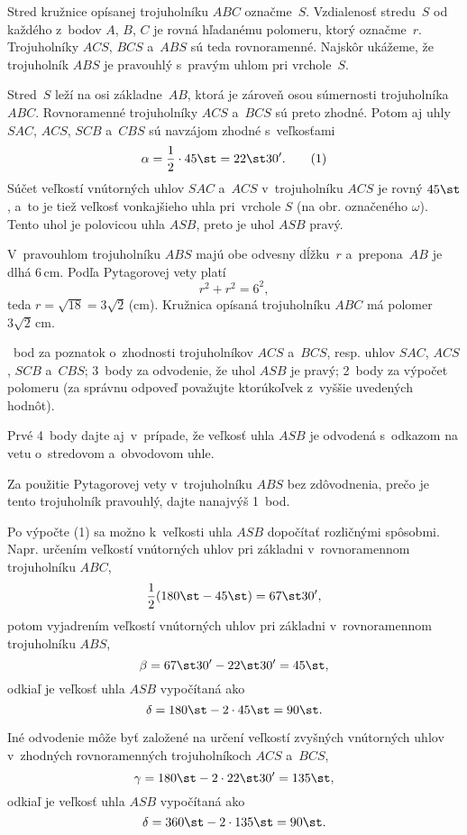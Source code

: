 {%
Stred kružnice opísanej trojuholníku $ABC$ označme~$S$.
Vzdialenosť stredu~$S$ od každého z~bodov $A$, $B$, $C$ je rovná hľadanému polomeru, ktorý označme~$r$.
Trojuholníky $ACS$, $BCS$ a~$ABS$ sú teda rovnoramenné.
Najskôr ukážeme, že trojuholník $ABS$ je pravouhlý s~pravým uhlom pri vrchole~$S$.

Stred~$S$ leží na osi základne~$AB$, ktorá je zároveň osou súmernosti trojuholníka $ABC$.
Rovnoramenné trojuholníky $ACS$ a~$BCS$ sú preto zhodné.
Potom aj uhly $SAC$, $ACS$, $SCB$ a~$CBS$ sú navzájom zhodné s~veľkosťami
$$
\alpha=\frac12\cdot 45\st=22\st30'. \tag{1}
$$
Súčet veľkostí vnútorných uhlov $SAC$ a~$ACS$ v~trojuholníku $ACS$ je rovný $45\st$, a~to je tiež veľkosť vonkajšieho uhla pri~vrchole $S$ (na obr. označeného $\omega$).
Tento uhol je polovicou uhla $ASB$, preto je uhol $ASB$ pravý.
%


V~pravouhlom trojuholníku $ABS$ majú obe odvesny dĺžku~$r$ a~prepona~$AB$ je dlhá 6\,cm.
Podľa Pytagorovej vety platí
$$
r^2+r^2=6^2,
$$
teda $r=\sqrt{18}=3\sqrt2$\,(cm).
Kružnica opísaná trojuholníku $ABC$ má polomer $3\sqrt2$\,cm.

~bod za poznatok o~zhodnosti trojuholníkov $ACS$ a~$BCS$, resp. uhlov $SAC$, $ACS$, $SCB$ a~$CBS$;
3~body za odvodenie, že uhol $ASB$ je pravý;
2~body za výpočet polomeru
(za správnu odpoveď považujte ktorúkoľvek z~vyššie uvedených hodnôt).

Prvé 4~body dajte aj~v~prípade, že veľkosť uhla $ASB$ je odvodená s~odkazom na vetu o~stredovom a~obvodovom uhle.

Za použitie Pytagorovej vety v~trojuholníku $ABS$ bez zdôvodnenia, prečo je tento trojuholník pravouhlý, dajte nanajvýš 1~bod.
\endhodnotenie

\poznamky
Po výpočte (1) sa možno k~veľkosti uhla $ASB$ dopočítať rozličnými spôsobmi.
Napr. určením veľkostí vnútorných uhlov pri základni v~rovnoramennom trojuholníku $ABC$,
$$
\frac12(180\st-45\st)=67\st30',
$$
potom vyjadrením veľkostí vnútorných uhlov pri základni v~rovnoramennom trojuholníku $ABS$,
$$
\beta=67\st30'-22\st30'=45\st,
$$
odkiaľ je veľkosť uhla $ASB$ vypočítaná ako
$$
\delta=180\st-2\cdot45\st=90\st.
$$

Iné odvodenie môže byť založené na určení veľkostí zvyšných vnútorných uhlov
v~zhodných rovnoramenných trojuholníkoch $ACS$ a~$BCS$,
$$
\gamma=180\st-2\cdot22\st30'=135\st,
$$
odkiaľ je veľkosť uhla $ASB$ vypočítaná ako
$$
\delta=360\st-2\cdot135\st=90\st.
$$
%
}



